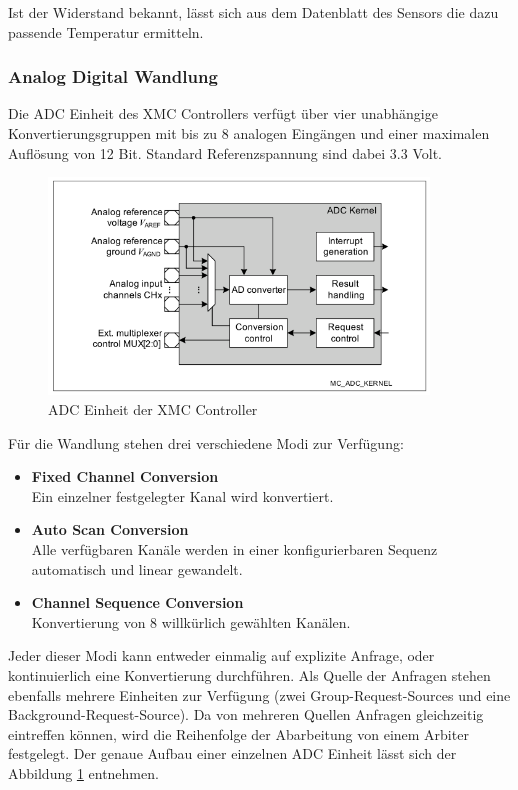 Ist der Widerstand bekannt, lässt sich aus dem Datenblatt des Sensors die dazu passende Temperatur ermitteln.

\subsubsection{Analog Digital Wandlung}
Die ADC Einheit des XMC Controllers verfügt über vier unabhängige Konvertierungsgruppen mit bis zu 8 analogen Eingängen und einer maximalen Auflösung von 12 Bit. Standard Referenzspannung sind dabei 3.3 Volt.

\begin{figure}[h]
\centering
\includegraphics[width=0.9\textwidth]{sensor/xmc_adc.PNG}
\caption{ADC Einheit der XMC Controller}
\label{img:xmc_adc}
\end{figure}

Für die Wandlung stehen drei verschiedene Modi zur Verfügung: 
\begin{itemize}
\item \textbf{Fixed Channel Conversion} \\
Ein einzelner festgelegter Kanal wird konvertiert.
\item \textbf{Auto Scan Conversion} \\
Alle verfügbaren Kanäle werden in einer konfigurierbaren Sequenz automatisch und linear gewandelt.
\item \textbf{Channel Sequence Conversion} \\
Konvertierung von 8 willkürlich gewählten Kanälen.
\end{itemize}
Jeder dieser Modi kann entweder einmalig auf explizite Anfrage, oder kontinuierlich eine Konvertierung durchführen. Als Quelle der Anfragen stehen ebenfalls mehrere Einheiten zur Verfügung (zwei Group-Request-Sources und eine Background-Request-Source). Da von mehreren Quellen Anfragen gleichzeitig eintreffen können, wird die Reihenfolge der Abarbeitung von einem Arbiter festgelegt. Der genaue Aufbau einer einzelnen ADC Einheit lässt sich der Abbildung \ref{img:xmc_adc} entnehmen. \\

